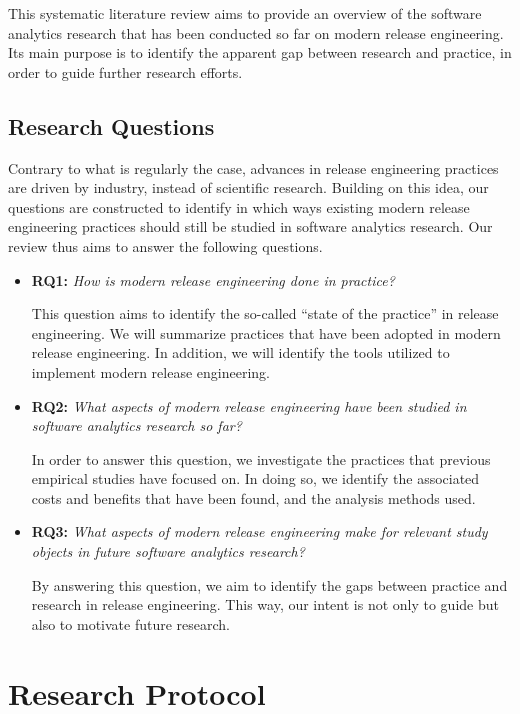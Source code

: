 \documentclass[]{book}
\begin{document}
This systematic literature review aims to provide an overview of the
software analytics research that has been conducted so far on modern
release engineering. Its main purpose is to identify the apparent gap
between research and practice, in order to guide further research
efforts.

\hypertarget{research-questions-1}{\subsection{Research
Questions}\label{research-questions-1}}

Contrary to what is regularly the case, advances in release engineering
practices are driven by industry, instead of scientific research.
Building on this idea, our questions are constructed to identify in
which ways existing modern release engineering practices should still be
studied in software analytics research. Our review thus aims to answer
the following questions.

\begin{itemize}
\item
  \textbf{RQ1:} \emph{How is modern release engineering done in
  practice?}

  This question aims to identify the so-called ``state of the practice''
  in release engineering. We will summarize practices that have been
  adopted in modern release engineering. In addition, we will identify
  the tools utilized to implement modern release engineering.
\item
  \textbf{RQ2:} \emph{What aspects of modern release engineering have
  been studied in software analytics research so far?}

  In order to answer this question, we investigate the practices that
  previous empirical studies have focused on. In doing so, we identify
  the associated costs and benefits that have been found, and the
  analysis methods used.
\item
  \textbf{RQ3:} \emph{What aspects of modern release engineering make
  for relevant study objects in future software analytics research?}

  By answering this question, we aim to identify the gaps between
  practice and research in release engineering. This way, our intent is
  not only to guide but also to motivate future research.
\end{itemize}

\section{Research Protocol}\label{research-protocol-3}
\end{document}
